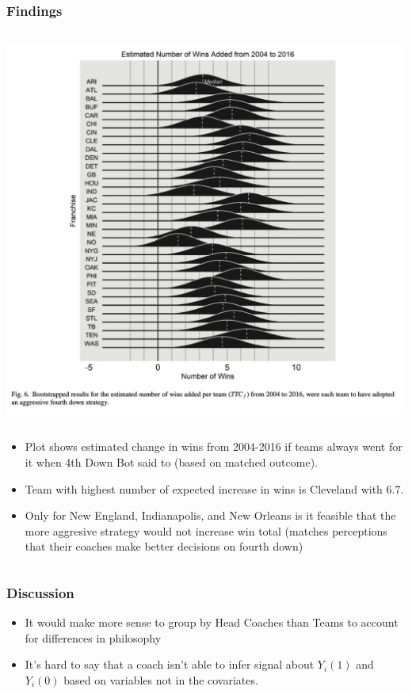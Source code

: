 \documentclass[t]{beamer}
\begin{document}
\begin{frame}
  \frametitle{Findings}
  \begin{column}{0.5\linewidth}
      \includegraphics[width=\linewidth]{./team_wins.png} 
    \end{column}
    \begin{column}{0.5\linewidth}
      \begin{itemize}
      \item \small Plot shows estimated change in wins from 2004-2016 if teams always went for it when 4th Down Bot said to (based on matched outcome).
      \item Team with highest number of expected increase in wins is Cleveland with 6.7.
      \item Only for New England, Indianapolis, and New Orleans is it feasible that the more aggresive strategy would not increase win total (matches perceptions that their coaches make better decisions on fourth down)
      \end{itemize}
    \end{column}
\end{frame}
\begin{frame}
  \frametitle{Discussion}
  \begin{itemize}
  \item It would make more sense to group by Head Coaches than Teams to account for differences in philosophy
  \item It's hard to say that a coach isn't able to infer signal about $Y_i(1)$ and $Y_i(0)$ based on variables not in the covariates.
  \end{itemize}
  \end{frame}
\end{document}
